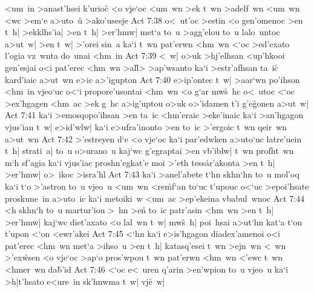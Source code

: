 <um~in
>anast'hsei
k'urioc\r{}
<o
vje`oc
<um~wn
>ek
t~wn
>adelf~wn
<um~wn
<wc
>em`e
a>uto~u\r{}
>ako'usesje\bibvsend
\vs Act 7:38
o<~ut'oc
>estin
<o
gen'omenoc
>en
t~h|
>ekklhs'ia|
>en
t~h|
>er'hmw|
met`a
to~u
>agg'elou
to~u
lalo~untoc
a>ut~w|
>en
t~w|
>'orei
sin~a
ka`i
t~wn
pat'erwn
<hm~wn
<`oc
>ed'exato
l'ogia
vz~wnta
do~unai
<hm~in\bibvsend
\vs Act 7:39
<~w|
o>uk
>hj'elhsan
<up'hkooi
gen'esjai
o<i
pat'erec
<hm~wn
>al\r{l}>
>ap'wsanto
ka`i
>estr'afhsan
ta~ic\r{}
kard'iaic
a>ut~wn
e>ic
a>'igupton\bibvsend
\vs Act 7:40
e>ip'ontec
t~w|
>aar`wn
po'ihson
<hm~in
vjeo`uc
o<`i
propore'usontai
<hm~wn
<o
g`ar
mw\r{s}~hc
o<~utoc
<`oc
>ex'hgagen
<hm~ac
>ek
g~hc
a>ig'uptou
o>uk
o>'idamen
t'i
g'e\r{g}onen
a>ut~w|\bibvsend
\vs Act 7:41
ka`i
>emosqopo'ihsan
>en
ta~ic
<hm'eraic
>eke'inaic
ka`i
>an'hgagon
vjus'ian
t~w|
e>id'wlw|
ka`i
e>ufra'inonto
>en
to~ic
>'ergoic
t~wn
qeir~wn
a>ut~wn\bibvsend
\vs Act 7:42
>'estreyen
d`e
<o
vje`oc
ka`i
par'edwken
a>uto`uc
latre'uein
t~h|
strati~a|
to~u
o>urano~u
kaj`wc
g'egraptai
>en
vb'iblw|
t~wn
profht~wn
m`h
sf'agia
ka`i
vjus'iac
proshn'egkat'e
moi
>'eth
tess\r{a}r'akonta
>en
t~h|
>er'hmw|
o>~ikoc
>isra'hl\bibvsend
\vs Act 7:43
ka`i
>anel'abete
t`hn
skhn`hn
to~u
mol'oq
ka`i
t`o
>'astron
to~u
vjeo~u
<um~wn
<re\r{m}f`an
to`uc
t'upouc
o<`uc
>epoi'hsate
proskune~in
a>uto~ic
ka`i
metoiki~w
<um~ac
>ep'ekeina
vbabul~wnoc\bibvsend
\vs Act 7:44
<h
skhn`h
to~u
martur'iou
>~hn
>e\r{n}
to~ic
patr'asin
<hm~wn
>en
t~h|
>er'hmw|
kaj`wc
diet'axato
<o
lal~wn
t~w|
mw\r{s}~h|
poi~hsai
a>ut`hn
kat`a
t`on
t'upon
<`on
<ewr'akei\bibvsend
\vs Act 7:45
<`hn
ka`i
e>is'hgagon
diadex'amenoi
o<i
pat'erec
<hm~wn
met`a
>ihso~u
>en
t~h|
katasq'esei
t~wn
>ejn~wn
<~wn
>'ex\r{w}sen
<o
vje`oc
>ap`o
pros'wpou
t~wn
pat'erwn
<hm~wn
<'ewc
t~wn
<hmer~wn
da\r{b}'id\bibvsend
{}
\vs Act 7:46
<`oc
e<~uren
q'arin
>en'wpion
to~u
vjeo~u
ka`i
>h|t'hsato
e<ure~in
sk'hnwma
t~w|
vj\r{e}~w|

